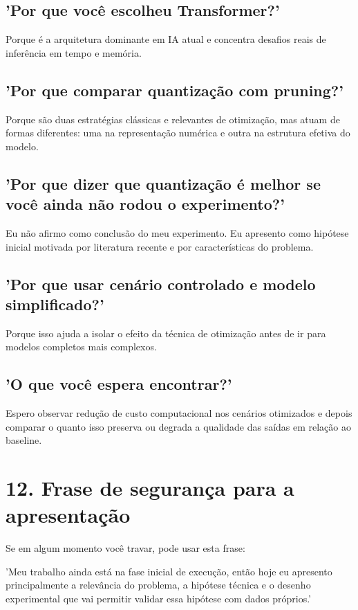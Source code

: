 \subsection{'Por que você escolheu Transformer?'}


Porque é a arquitetura dominante em IA atual e concentra desafios reais de inferência em tempo e memória.



\subsection{'Por que comparar quantização com pruning?'}


Porque são duas estratégias clássicas e relevantes de otimização, mas atuam de formas diferentes: uma na representação numérica e outra na estrutura efetiva do modelo.



\subsection{'Por que dizer que quantização é melhor se você ainda não rodou o experimento?'}


Eu não afirmo como conclusão do meu experimento. Eu apresento como hipótese inicial motivada por literatura recente e por características do problema.



\subsection{'Por que usar cenário controlado e modelo simplificado?'}


Porque isso ajuda a isolar o efeito da técnica de otimização antes de ir para modelos completos mais complexos.



\subsection{'O que você espera encontrar?'}


Espero observar redução de custo computacional nos cenários otimizados e depois comparar o quanto isso preserva ou degrada a qualidade das saídas em relação ao baseline.



\section{12. Frase de segurança para a apresentação}



Se em algum momento você travar, pode usar esta frase:



'Meu trabalho ainda está na fase inicial de execução, então hoje eu apresento principalmente a relevância do problema, a hipótese técnica e o desenho experimental que vai permitir validar essa hipótese com dados próprios.'
